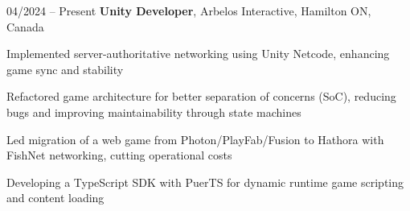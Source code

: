 \begin{twocolentry}{
    04/2024 – Present
}
   \textbf{Unity Developer}, Arbelos Interactive, Hamilton ON, Canada \end{twocolentry}

\vspace{0.10 cm}
\begin{onecolentry}
   \begin{highlights}
       \item Implemented server-authoritative networking using Unity Netcode, enhancing game sync and stability
       \item Refactored game architecture for better separation of concerns (SoC), reducing bugs and improving maintainability through state machines
       \item Led migration of a web game from Photon/PlayFab/Fusion to Hathora with FishNet networking, cutting operational costs
       \item Developing a TypeScript SDK with PuerTS for dynamic runtime game scripting and content loading
   \end{highlights}
\end{onecolentry}